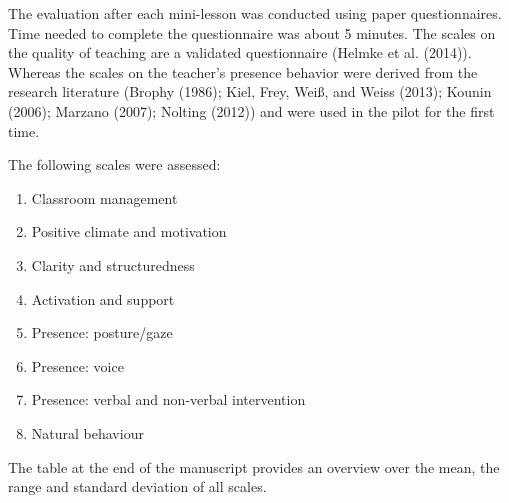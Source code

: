 \documentclass[
  english,
  man,floatsintext]{apa6}
\providecommand{\tightlist}{%
  \setlength{\itemsep}{0pt}\setlength{\parskip}{0pt}}
\begin{document}
The evaluation after each mini-lesson was conducted using paper questionnaires. Time needed to complete the questionnaire was about 5 minutes.
The scales on the quality of teaching are a validated questionnaire (Helmke et al. (2014)). Whereas the scales on the teacher's presence behavior were derived from the research literature (Brophy (1986); Kiel, Frey, Weiß, and Weiss (2013); Kounin (2006); Marzano (2007); Nolting (2012)) and were used in the pilot for the first time.

The following scales were assessed:

\begin{enumerate}
\def\labelenumi{(\arabic{enumi})}
\tightlist
\item
  Classroom management
\item
  Positive climate and motivation
\item
  Clarity and structuredness
\item
  Activation and support
\item
  Presence: posture/gaze
\item
  Presence: voice
\item
  Presence: verbal and non-verbal intervention
\item
  Natural behaviour
\end{enumerate}

The table at the end of the manuscript provides an overview over the mean, the range and standard deviation of all scales.
\end{document}
